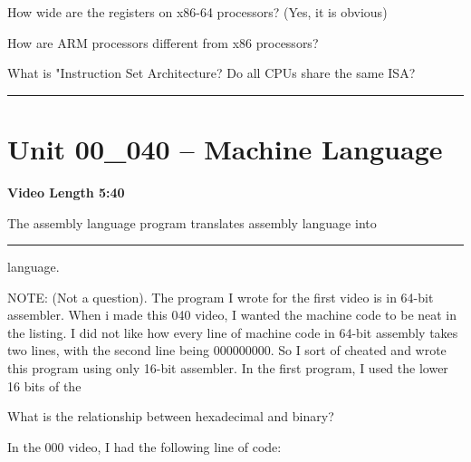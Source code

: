 \documentclass[letterpaper,12pt]{exam}
\newcommand{\unit}{Unit 00}
\begin{document}
\begin{questions}
\begin{samepage}
   
\end{samepage}
\par 
\begin{samepage}
    \question How wide are the registers on x86-64 processors? (Yes, it is obvious)
    \vspace{5mm}
\end{samepage}

\begin{samepage}
    \question How are ARM processors different from x86 processors?
    \vspace{5mm}
\end{samepage}
\par
\begin{samepage}
    \question What is "Instruction Set Architecture? Do all CPUs share the same ISA?
    \vspace{15mm}
\end{samepage}
\par

\rule{0.5\textwidth}{.4pt} %

\section*{\unit\_040 -- Machine Language}
\par{\selectfont\textbf{Video Length 5:40}}
\begin{samepage}
    \question The assembly language program translates assembly language into \rule{3cm}{0.15mm} language.
    \vspace{5mm}
\end{samepage}
\par

NOTE:  (Not a question).  The program I wrote for the first video is in 64-bit assembler.  When i made this 040 video, I wanted the machine code to be neat in the listing.  I did not like how every line of machine code in 64-bit assembly takes two lines, with the second line being 000000000.  So I sort of cheated and wrote this program using only 16-bit assembler.  In the first program, I used the %
lower 16 bits of the %

\begin{samepage}
    \question What is the relationship between hexadecimal and binary?
    \vspace{5mm}
\end{samepage}
\par
 \begin{samepage}
     \question In the 000 video, I had the following line of code:


\end{samepage}
\end{questions}
\end{document}
